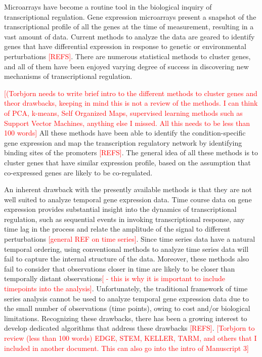 \documentclass{bioinfo}
\begin{document}
Microarrays have become a routine tool in the biological inquiry of
transcriptional regulation. Gene expression microarrays present a
snapshot of the transcriptional profile of all the genes at the time
of measurement, resulting in a vast amount of data. Current methods to
analyze the data are geared to identify genes that have differential
expression in response to genetic or environmental perturbations
\textcolor{red}{[REFS]}. There are numerous statistical methods to
cluster genes, and all of them have been enjoyed varying degree of
success in discovering new mechanisms of transcriptional
regulation. 

 \textcolor{red}{[(Torbjorn needs to write brief intro to
  the different methods to cluster genes and theor drawbacks, keeping
  in mind this is not a review of the methods. I can think of PCA,
  k-means, Self Organized Maps, supervised learning methods such as
  Support Vector Machines, anything else I missed. All this needs to
  be less than 100 words]}  All these methods have been able to
identify the condition-specific gene expression and map the
transcription regulatory network by identifying binding sites of the
promoters \textcolor{red}{[REFS]}. The general idea of all these
methods is to cluster genes that have similar expression profile,
based on the assumption that co-expressed genes are likely to be
co-regulated. 

An inherent drawback with the presently available methods is that they
are not well suited to analyze temporal gene expression data. Time
course data on gene expression provides substantial insight into the
dynamics of transcriptional regulation, such as sequential events in
invoking transcriptional response, any time lag in the process and
relate the amplitude of the signal to different perturbations
\textcolor{red}{[general REF on time series]}. Since time series data
have a natural temporal ordering, using conventional methods to
analyze time series data will fail to capture the internal structure
of the data. Moreover, these methods also fail to consider that
observations closer in time are likely to be closer than temporally
distant observations\textcolor{red}{[ - this is why it is important to
  include timepoints into the analysis]}. Unfortunately, the
traditional framework of time series analysis cannot be used to
analyze temporal gene expression data due to the small number of
observations (time points), owing to cost and/or biological
limitations. Recognizing these drawbacks, there has been a growing
interest to develop dedicated algorithms that address these drawbacks
\textcolor{red}{[REFS]}.  
\textcolor{red}{[Torbjorn to review (less than 100 words) EDGE, STEM,
  KELLER, TARM, and others that I included in another document. This
  can also go into the intro of Manuscript 3]} 
\end{document}
